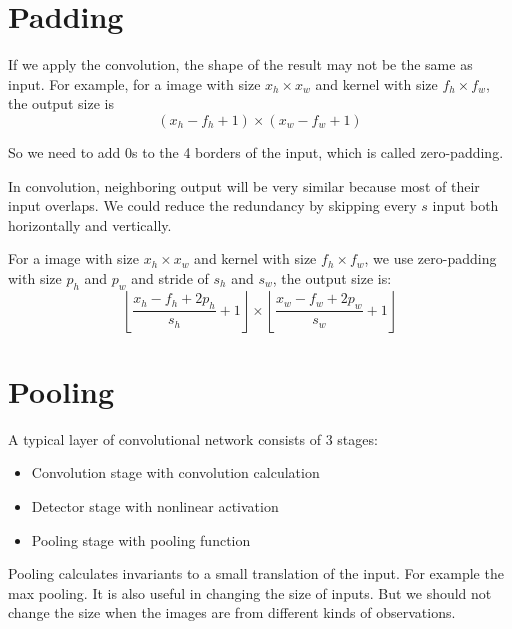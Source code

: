 \section{Padding}

\begin{definition}
    If we apply the convolution, the shape of the result may not be the same as input. For example, for a image with size $x_h \times x_w$ and kernel with size $f_h \times f_w$, the output size is
    \begin{equation}
        (x_h - f_h + 1) \times (x_w - f_w + 1)
    \end{equation}
    
    So we need to add $0$s to the 4 borders of the input, which is called zero-padding.
\end{definition}

\begin{definition}[Stride]
    In convolution, neighboring output will be very similar because most of their input overlaps. We could reduce the redundancy by skipping every $s$ input both horizontally and vertically.
\end{definition}

\begin{theorem}
    For a image with size $x_h \times x_w$ and kernel with size $f_h \times f_w$, we use zero-padding with size $p_h$ and $p_w$ and stride of $s_h$ and $s_w$, the output size is:
    \begin{equation}
        \left\lfloor \frac{x_h - f_h + 2p_h}{s_h} + 1 \right\rfloor \times \left\lfloor \frac{x_w - f_w + 2p_w}{s_w} + 1 \right\rfloor
    \end{equation}
\end{theorem}



\section{Pooling}

A typical layer of convolutional network consists of 3 stages:
\begin{itemize}
    \item Convolution stage with convolution calculation
    \item Detector stage with nonlinear activation
    \item Pooling stage with pooling function
\end{itemize}


Pooling calculates invariants to a small translation of the input. For example the max pooling. It is also useful in changing the size of inputs. But we should not change the size when the images are from different kinds of observations.

